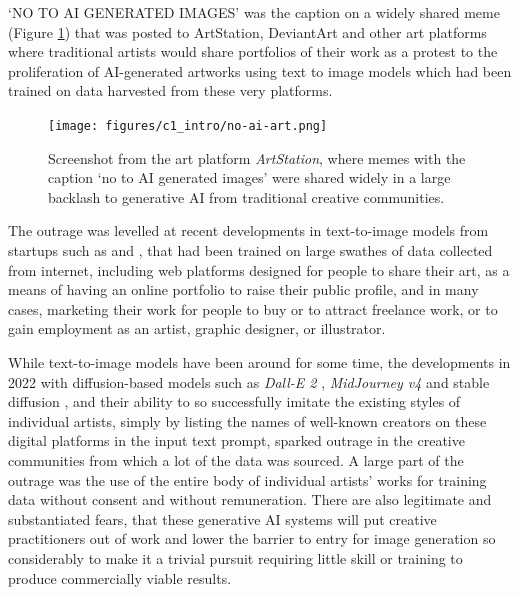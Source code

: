 `NO TO AI GENERATED IMAGES' was the caption on a widely shared meme (Figure \ref{fig:c1:no-ai-art}) that was posted to ArtStation, DeviantArt and other art platforms where traditional artists would share portfolios of their work as a protest to the proliferation of AI-generated artworks using text to image models which had been trained on data harvested from these very platforms. 

\begin{figure}[!htb]
    \centering
    \captionsetup{justification=centering}
    \texttt{[image: figures/c1\_intro/no-ai-art.png]}
    \caption['No-AI memes being shared on the platform ArtStation]{Screenshot from the art platform \textit{ArtStation}, where memes with the caption `no to AI generated images' were shared widely in a large backlash to generative AI from traditional creative communities.}
    \label{fig:c1:no-ai-art}
\end{figure}

The outrage was levelled at recent developments in text-to-image models from startups such as \cite{midjourney2023midjourney} and \cite{stability2023stability}, that had been trained on large swathes of data collected from internet, including web platforms designed for people to share their art, as a means of having an online portfolio to raise their public profile, and in many cases, marketing their work for people to buy or to attract freelance work, or to gain employment as an artist, graphic designer, or illustrator.

While text-to-image models have been around for some time, the developments in 2022 with diffusion-based models such as \textit{Dall-E 2} \citep{openai2022dalle2}, \textit{MidJourney v4} \citep{edwards2022midjourney} and stable diffusion \citep{stability2022stable}, and their ability to so successfully imitate the existing styles of individual artists, simply by listing the names of well-known creators on these digital platforms in the input text prompt, sparked outrage in the creative communities from which a lot of the data was sourced. 
A large part of the outrage was the use of the entire body of individual artists' works for training data without consent and without remuneration.
There are also legitimate and substantiated fears, that these generative AI systems will put creative practitioners out of work and lower the barrier to entry for image generation so considerably to make it a trivial pursuit requiring little skill or training to produce commercially viable results.

